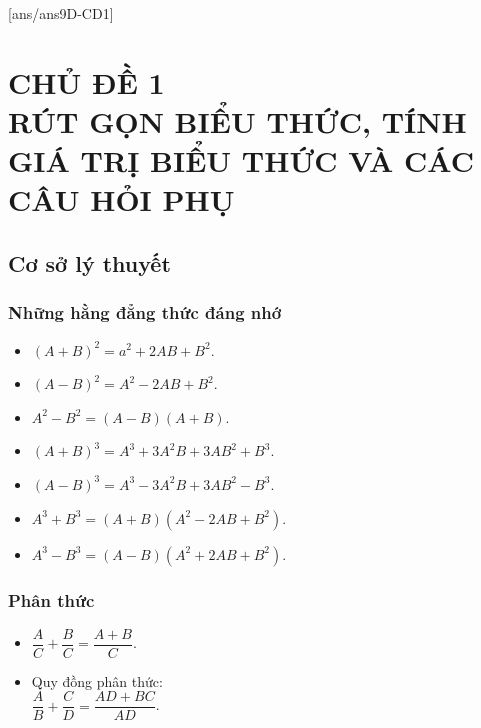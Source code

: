 [ans/ans9D-CD1]
\chapter*{CHỦ ĐỀ 1 \\ RÚT GỌN BIỂU THỨC, TÍNH GIÁ TRỊ BIỂU THỨC VÀ CÁC CÂU HỎI PHỤ}
\setcounter{section}{0}
\section{Cơ sở lý thuyết}
\subsection{Những hằng đẳng thức đáng nhớ}
\begin{itemize}
	\item $(A+B)^2=a^2+2AB+B^2$.
	\item $(A-B)^2=A^2-2AB+B^2$.
	\item $A^2-B^2=(A-B)(A+B)$.
	\item $(A+B)^3=A^3+3A^2B+3AB^2+B^3$.
	\item $(A-B)^3=A^3-3A^2B+3AB^2-B^3$.
	\item $A^3+B^3=(A+B)(A^2-2AB+B^2)$.
	\item $A^3-B^3=(A-B)(A^2+2AB+B^2)$.
\end{itemize}
\subsection{Phân thức}
\begin{itemize}
	\item $\dfrac{A}{C}+\dfrac{B}{C}=\dfrac{A+B}{C}$.
	\item Quy đồng phân thức:\\
	$\dfrac{A}{B}+\dfrac{C}{D}=\dfrac{AD+BC}{AD}$.
\end{itemize}
